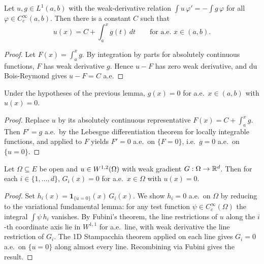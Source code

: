 \begin{lemma}[$W^{1,1}$ AC representative]
\label{lem:w11_ae_eq_ac_representative}
\leanok
Let $u, g \in L^{1}(a,b)$ with the weak-derivative relation
$\int u\,\varphi' = -\int g\,\varphi$ for all $\varphi \in C_c^{\infty}(a,b)$. Then there
is a constant $C$ such that
\begin{equation*}
u(x) = C + \int_a^{x} g(t)\, dt \qquad \text{for a.e. } x \in (a,b).
\end{equation*}
\end{lemma}
\begin{proof}
\leanok
{}

Let $F(x) = \int_a^{x} g$. By integration by parts for absolutely continuous functions,
$F$ has weak derivative $g$. Hence $u - F$ has zero weak derivative, and du Bois-Reymond
gives $u - F = C$ a.e.
\end{proof}

\begin{theorem}
\label{thm:stampacchia_1d}
\leanok
Under the hypotheses of the previous lemma, $g(x) = 0$ for a.e.\ $x \in (a,b)$
with $u(x) = 0$.
\end{theorem}
\begin{proof}
\leanok
{}

Replace $u$ by its absolutely continuous representative $F(x) = C + \int_a^x g$. Then
$F' = g$ a.e.\ by the Lebesgue differentiation theorem for locally integrable
functions, and  applied to $F$ yields
$F' = 0$ a.e.\ on $\{F = 0\}$, i.e.\ $g = 0$ a.e.\ on $\{u = 0\}$.
\end{proof}

\begin{theorem}
\label{thm:weakGrad_ae_eq_zero_on_zeroSet}
\leanok
{}
Let $\Omega \subseteq E$ be open and $u \in W^{1,2}(\Omega)$ with weak gradient
$G : \Omega \to \mathbb{R}^{d}$. Then for each $i \in \{1,\dots,d\}$, $G_i(x) = 0$ for a.e.\
$x \in \Omega$ with $u(x) = 0$.
\end{theorem}
\begin{proof}
\leanok
{}

Set $h_i(x) = \mathbf{1}_{\{u = 0\}}(x)\, G_i(x)$. We show $h_i = 0$ a.e.\ on $\Omega$
by reducing to the variational fundamental lemma: for any test function
$\psi \in C_c^{\infty}(\Omega)$ the integral $\int \psi\, h_i$ vanishes. By Fubini's
theorem, the line restrictions of $u$ along the $i$-th coordinate axis lie in
$W^{1,1}$ for a.e.\ line, with weak derivative the line restriction of $G_i$. The 1D
Stampacchia theorem applied on each line gives $G_i = 0$ a.e.\ on
$\{u = 0\}$ along almost every line. Recombining via Fubini gives the result.
\end{proof}

